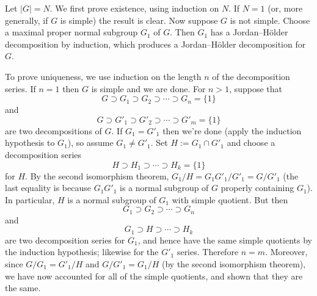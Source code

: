 \documentclass{article}
\begin{document}
Let $|G| = N$. We first prove existence, using induction on $N$. If $N=1$ (or, more generally, if $G$ is simple) the result is clear. Now suppose $G$ is not simple. Choose a maximal proper normal subgroup $G_1$ of $G$. Then $G_1$ has a Jordan--H\"older decomposition by induction, which produces a Jordan--H\"older decomposition for $G$.

To prove uniqueness, we use induction on the length $n$ of the decomposition series. If $n=1$ then $G$ is simple and we are done. For $n>1$, suppose that
$$
G \supset G_1 \supset G_2 \supset \cdots \supset G_n = \{1\}
$$
and
$$
G \supset G'_1 \supset G'_2 \supset \cdots \supset G'_m = \{1\}
$$
are two decompositions of $G$. If $G_1 = G'_1$ then we're done (apply the induction hypothesis to $G_1$), so assume $G_1 \neq G'_1$. Set $H := G_1 \cap G'_1$ and choose a decomposition series
$$
H \supset H_1 \supset \cdots \supset H_k = \{1\}
$$
for $H$. By the second isomorphism theorem, $G_1/H = G_1 G'_1/G'_1 = G/G'_1$ (the last equality is because $G_1 G'_1$ is a normal subgroup of $G$ properly containing $G_1$). In particular, $H$ is a normal subgroup of $G_1$ with simple quotient. But then
$$
G_1 \supset G_2 \supset \cdots \supset G_n
$$
and
$$
G_1 \supset H \supset \cdots \supset H_k
$$
are two decomposition series for $G_1$, and hence have the same simple quotients by the induction hypothesis; likewise for the $G'_1$ series. Therefore $n=m$. Moreover, since $G/G_1 = G'_1/H$ and $G/G'_1 = G_1/H$ (by the second isomorphism theorem), we have now accounted for all of the simple quotients, and shown that they are the same.
\end{document}
